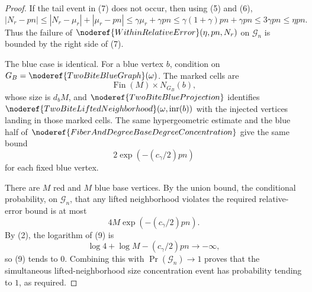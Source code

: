 \begin{proof}
If the tail event in (7) does not occur, then using (5) and (6),
\[
|N_r-pn|
\le |N_r-\mu_r|+|\mu_r-pn|
\le \gamma\mu_r+\gamma pn
\le \gamma(1+\gamma)pn+\gamma pn
\le 3\gamma pn
\le \eta pn.
\tag{8}
\]
Thus the failure of
\(\noderef{WithinRelativeError}(\eta,pn,N_r)\) on \(\mathcal G_n\) is bounded
by the right side of (7).

The blue case is identical.  For a blue vertex \(b\), condition on
\(G_B=\noderef{TwoBiteBlueGraph}(\omega)\).  The marked cells are
\[
\operatorname{Fin}(M)\times N_{G_B}(b),
\]
whose size is \(d_bM\), and
\(\noderef{TwoBiteBlueProjection}\) identifies
\(\noderef{TwoBiteLiftedNeighborhood}(\omega,\operatorname{inr}(b))\) with
the injected vertices landing in those marked cells.  The same
hypergeometric estimate and the blue half of
\(\noderef{FiberAndDegreeBaseDegreeConcentration}\) give the same bound
\[
2\exp(-(c_\gamma/2)pn)
\]
for each fixed blue vertex.

There are \(M\) red and \(M\) blue base vertices.  By the union bound, the
conditional probability, on \(\mathcal G_n\), that any lifted neighborhood
violates the required relative-error bound is at most
\[
4M\exp(-(c_\gamma/2)pn).
\tag{9}
\]
By (2), the logarithm of (9) is
\[
\log 4+\log M-(c_\gamma/2)pn\to-\infty,
\]
so (9) tends to \(0\).  Combining this with
\(\Pr(\mathcal G_n)\to1\) proves that the simultaneous lifted-neighborhood
size concentration event has probability tending to \(1\), as required.
\end{proof}
